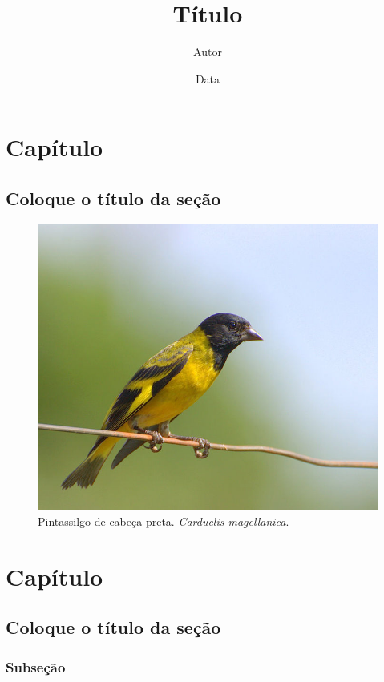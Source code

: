 \documentclass[a4paper]{book}
\title{Título}
\author{Autor}
\date{Data}
\begin{document}
\frenchspacing

\maketitle

\pagestyle{plain}

\tableofcontents %
\listoffigures %




\chapter{Capítulo}
\pagestyle{fancy}

\section{Coloque o título da seção}
\lipsum[1-5]


\begin{figure}
\centering
\includegraphics[width=0.5\linewidth]{pintassilgo}
\caption{Pintassilgo-de-cabeça-preta. \textit{Carduelis magellanica}.}
\label{pintassilgo}
\end{figure}


\chapter{Capítulo}

\section{Coloque o título da seção}
\lipsum[1]

\subsection{Subseção}
\end{document}
